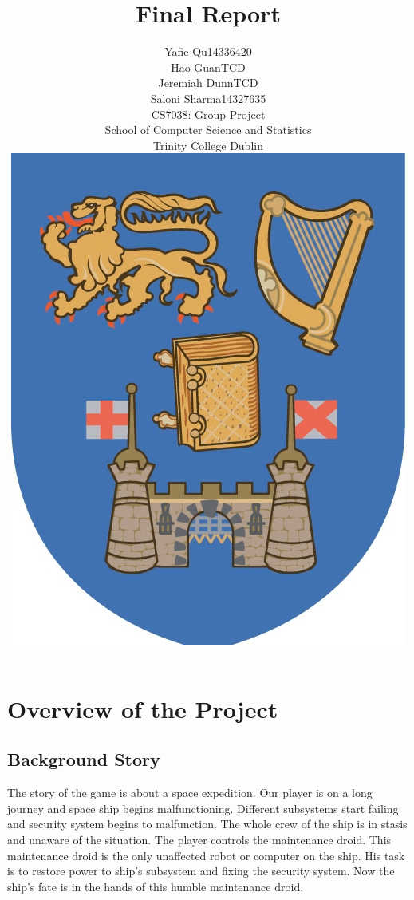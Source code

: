 \documentclass[11pt]{article}
\begin{document}
\title{Final Report}
\author{Yafie Qu\hspace{19 mm}14336420\\Hao Guan\hspace{10 mm}TCD\\Jeremiah Dunn\hspace{10 mm}TCD\\Saloni Sharma\hspace{10 mm}14327635\\CS7038: Group Project\\School of Computer Science and Statistics\\Trinity College Dublin\\\includegraphics[scale=1.5]{TCD.jpg}}
\maketitle
\section{Overview of the Project}
\subsection{Background Story}
The story of the game is about a space expedition. Our player is on a long journey and space ship begins malfunctioning. Different subsystems start failing and security system begins to malfunction. The whole crew of the ship is in stasis and unaware of the situation. The player controls the maintenance droid.  This maintenance droid is the only unaffected robot or computer on the ship. His task is to restore power to ship's subsystem and fixing the security system. Now the ship's fate is in the hands of this humble maintenance droid.
\end{document}

